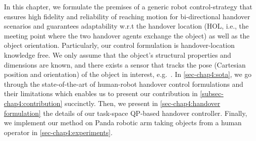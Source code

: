 In this chapter, we formulate the premises of a generic robot control-strategy that ensures high fidelity and reliability of reaching motion for bi-directional handover scenarios and guarantees adaptability w.r.t the handover location (HOL, i.e., the meeting point where the two handover agents exchange the object) as well as the object orientation. Particularly, our control formulation is handover-location knowledge free. We only assume that the object's structural properties and dimensions are known, and there exists a sensor that tracks the pose (Cartesian position and orientation) of the object in interest, e.g.~\cite{paolillo2018ral}. In \cref{sec-chap4:sota}, we go through the state-of-the-art of human-robot handover control formulations and their limitations which enables us to present our contribution in \cref{subsec-chap4:contribution} succinctly. Then, we present in \cref{sec-chap4:handover formulation} the details of our task-space QP-based handover controller. Finally, we implement our method on Panda robotic arm taking objects from a human operator in \cref{sec-chap4:experiments}. 





